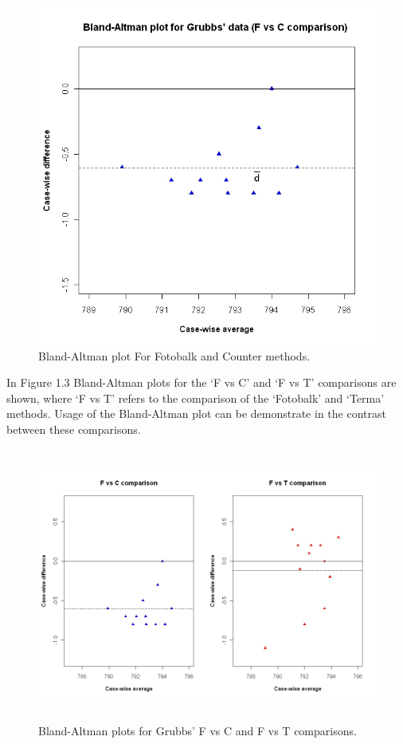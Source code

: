 \documentclass[Main.tex]{subfiles}
\begin{document}
	\begin{figure}[h!]
		\begin{center}
			\includegraphics[width=120mm]{images/GrubbsBAplot-noLOA.jpeg}
			\caption{Bland-Altman plot For Fotobalk and Counter methods.}\label{GrubbsBA-noLOA}
		\end{center}
	\end{figure}
	
	
	
	In Figure 1.3 Bland-Altman plots for the `F vs C' and `F vs T'
	comparisons are shown, where `F vs T' refers to the comparison of
	the `Fotobalk' and `Terma' methods. Usage of the Bland-Altman plot
	can be demonstrate in the contrast between these comparisons.
	
	\begin{figure}[h!]
		\begin{center}
			\includegraphics[height=90mm]{images/GrubbsDataTwoBAplots.jpeg}
			\caption{Bland-Altman plots for Grubbs' F vs C and F vs T comparisons.}\label{GrubbsDataTwoBAplots}
		\end{center}
	\end{figure}
	
\end{document}
